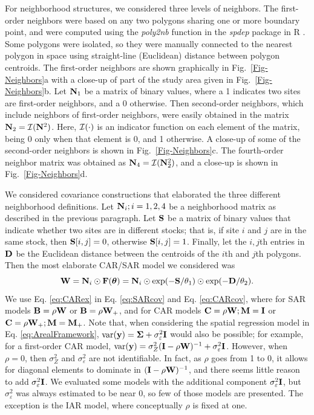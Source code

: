 \documentclass[11pt, titlepage]{article}\usepackage[]{graphicx}\usepackage[]{color}
\begin{document}
\begin{spacing}{1.9}
\begin{flushleft}
For neighborhood structures, we considered three levels of neighbors.  The first-order neighbors were based on any two polygons sharing one or more boundary point, and were computed using the \emph{poly2nb} function in the \emph{spdep} package \citep{Biva:Pira:comp:2015} in R \citep{R:Deve:Core:ALan:2016}. Some polygons were isolated, so they were manually connected to the nearest polygon in space using straight-line (Euclidean) distance between polygon centroids.  The first-order neighbors are shown graphically in Fig.~\ref{Fig-Neighbors}a with a close-up of part of the study area given in Fig.~\ref{Fig-Neighbors}b.  Let $\mathbf{N}_1$ be a matrix of binary values, where a 1 indicates two sites are first-order neighbors, and a 0 otherwise. Then second-order neighbors, which include neighbors of first-order neighbors, were easily obtained in the matrix $\mathbf{N}_2 = \mathcal{I}(\mathbf{N}^2)$. Here, $\mathcal{I}(\cdot)$ is an indicator function on each element of the matrix, being 0 only when that element is 0, and 1 otherwise. A close-up of some of the second-order neighbors is shown in Fig.~\ref{Fig-Neighbors}c. The fourth-order neighbor matrix was obtained as $\mathbf{N}_4 = \mathcal{I}(\mathbf{N}_2^2)$, and a close-up is shown in Fig.~\ref{Fig-Neighbors}d.

We considered covariance constructions that elaborated the three different neighborhood definitions.  Let $\mathbf{N}_i; i = 1,2,4$ be a neighborhood matrix as described in the previous paragraph.  Let $\mathbf{S}$ be a matrix of binary values that indicate whether two sites are in different stocks; that is, if site $i$ and $j$ are in the same stock, then $\mathbf{S}[i,j] = 0$, otherwise $\mathbf{S}[i,j] = 1$.  Finally, let the $i,j$th entries in $\mathbf{D}$ be the Euclidean distance between the centroids of the $i$th and $j$th polygons.  Then the most elaborate CAR/SAR model we considered was
\begin{equation} \label{eq:CARex}
	\mathbf{W} = \mathbf{N}_i \odot \mathbf{F}(\mbox{\boldmath $\theta$}) = \mathbf{N}_i \odot \exp(-\mathbf{S}/\theta_1) \odot \exp(-\mathbf{D}/\theta_2).
\end{equation}
We use Eq. \ref{eq:CARex} in Eq. \ref{eq:SARcov} and Eq. \ref{eq:CARcov}, where for SAR models $\mathbf{B} = \rho\mathbf{W}$ or $\mathbf{B} = \rho\mathbf{W}_+$, and for CAR models $\mathbf{C} = \rho\mathbf{W}; \mathbf{M} = \mathbf{I}$ or $\mathbf{C} = \rho\mathbf{W}_+; \mathbf{M} = \mathbf{M}_+$. Note that, when considering the spatial regression model in Eq. \ref{eq:ArealFramework}, $\textrm{var}(\mathbf{y}) = \mbox{\boldmath $\Sigma$} + \sigma^2_\varepsilon\mathbf{I}$ would also be possible; for example, for a first-order CAR model, $\textrm{var}(\mathbf{y}) = \sigma_Z^2(\mathbf{I} - \rho\mathbf{W})^{-1} + \sigma^2_\varepsilon\mathbf{I}$.  However, when $\rho=0$, then $\sigma_Z^2$ and $\sigma^2_\varepsilon$ are not identifiable. In fact, as $\rho$ goes from 1 to 0, it allows for diagonal elements to dominate in $(\mathbf{I} - \rho\mathbf{W})^{-1}$, and there seems little reason to add $\sigma^2_\varepsilon\mathbf{I}$.  We evaluated some models with the additional component $\sigma^2_\varepsilon\mathbf{I}$, but $\sigma^2_\varepsilon$ was always estimated to be near 0, so few of those models are presented.  The exception is the IAR model, where conceptually $\rho$ is fixed at one.


\end{flushleft}
\end{spacing}
\end{document}
